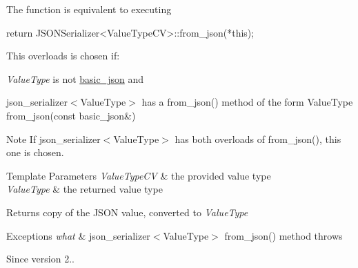 The function is equivalent to executing 
\begin{DoxyCode}
\textcolor{keywordflow}{return} JSONSerializer<ValueTypeCV>::from\_json(*\textcolor{keyword}{this});
\end{DoxyCode}


This overloads is chosen if\+:
\begin{DoxyItemize}
\item {\itshape Value\+Type} is not \mbox{\hyperlink{classnlohmann_1_1basic__json}{basic\+\_\+json}} and
\item json\+\_\+serializer$<$\+Value\+Type$>$ has a {\ttfamily from\+\_\+json()} method of the form {\ttfamily Value\+Type from\+\_\+json(const basic\+\_\+json\&)}
\end{DoxyItemize}

\begin{DoxyNote}{Note}
If json\+\_\+serializer$<$\+Value\+Type$>$ has both overloads of {\ttfamily from\+\_\+json()}, this one is chosen.
\end{DoxyNote}

\begin{DoxyTemplParams}{Template Parameters}
{\em Value\+Type\+CV} & the provided value type \\
\hline
{\em Value\+Type} & the returned value type\\
\hline
\end{DoxyTemplParams}
\begin{DoxyReturn}{Returns}
copy of the J\+S\+ON value, converted to {\itshape Value\+Type} 
\end{DoxyReturn}

\begin{DoxyExceptions}{Exceptions}
{\em what} & json\+\_\+serializer$<$\+Value\+Type$>$ {\ttfamily from\+\_\+json()} method throws\\
\hline
\end{DoxyExceptions}
\begin{DoxySince}{Since}
version 2.. 
\end{DoxySince}
\mbox{\label{classnlohmann_1_1basic__json_a64135c19425f00b346d8ed63a23db334}} 
